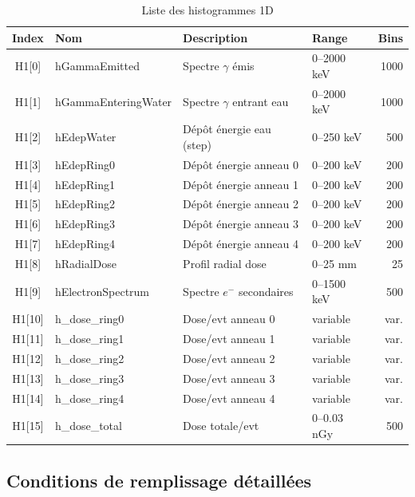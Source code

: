 \documentclass[11pt,a4paper]{article}
\begin{document}
\begin{table}[h]
\centering
\small
\begin{tabular}{clllr}
\toprule
\rowcolor{headerblue!20}
\textbf{Index} & \textbf{Nom} & \textbf{Description} & \textbf{Range} & \textbf{Bins} \\
\midrule
H1[0] & hGammaEmitted & Spectre $\gamma$ émis & 0--2000 keV & 1000 \\
\rowcolor{lightgray}
H1[1] & hGammaEnteringWater & Spectre $\gamma$ entrant eau & 0--2000 keV & 1000 \\
H1[2] & hEdepWater & Dépôt énergie eau (step) & 0--250 keV & 500 \\
\rowcolor{lightgray}
H1[3] & hEdepRing0 & Dépôt énergie anneau 0 & 0--200 keV & 200 \\
H1[4] & hEdepRing1 & Dépôt énergie anneau 1 & 0--200 keV & 200 \\
\rowcolor{lightgray}
H1[5] & hEdepRing2 & Dépôt énergie anneau 2 & 0--200 keV & 200 \\
H1[6] & hEdepRing3 & Dépôt énergie anneau 3 & 0--200 keV & 200 \\
\rowcolor{lightgray}
H1[7] & hEdepRing4 & Dépôt énergie anneau 4 & 0--200 keV & 200 \\
H1[8] & hRadialDose & Profil radial dose & 0--25 mm & 25 \\
\rowcolor{lightgray}
H1[9] & hElectronSpectrum & Spectre $e^-$ secondaires & 0--1500 keV & 500 \\
H1[10] & h\_dose\_ring0 & Dose/evt anneau 0 & variable & var. \\
\rowcolor{lightgray}
H1[11] & h\_dose\_ring1 & Dose/evt anneau 1 & variable & var. \\
H1[12] & h\_dose\_ring2 & Dose/evt anneau 2 & variable & var. \\
\rowcolor{lightgray}
H1[13] & h\_dose\_ring3 & Dose/evt anneau 3 & variable & var. \\
H1[14] & h\_dose\_ring4 & Dose/evt anneau 4 & variable & var. \\
\rowcolor{lightgray}
H1[15] & h\_dose\_total & Dose totale/evt & 0--0.03 nGy & 500 \\
\bottomrule
\end{tabular}
\caption{Liste des histogrammes 1D}
\end{table}

\subsection{Conditions de remplissage détaillées}
\end{document}
